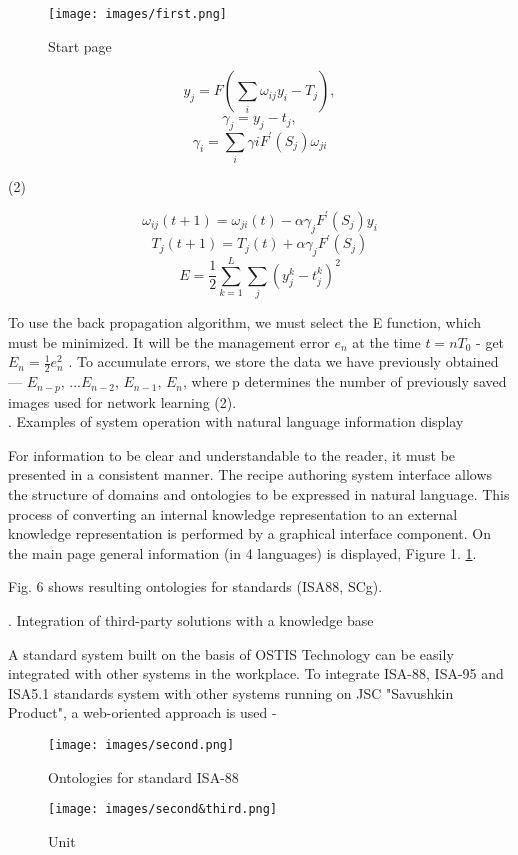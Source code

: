 \documentclass[twocolumn]{scndocument}
\begin{document}
 \setcounter{page}{168}
\begin{figure}[h]
    \centering
    \texttt{[image: images/first.png]} 
    \caption{Start page} 
    \label{Figure 1}
\end{figure}
$$y_j = F(\sum_{i}\omega_{ij} y_i - T_j ),$$
$$\gamma_{j} = y_{j} - t_{j} ,$$
$$\gamma_{i} = \sum_{i}\gamma{i}F^{'}(S_{j})\omega_{ji}$$ \begin{flushright} (2)\end{flushright}
$$\omega_{ij}(t + 1) = \omega_{ji}(t) - \alpha\gamma_{j}F^{'}(S_{j})y_i$$
$$T_{j}(t+1) = T_j(t) + \alpha\gamma_j F^{'} (S_j)$$
$$E = \frac{1}{2}\sum_{k=1}^{L} \sum_j (y_{j}^{k} - t_{j}^{k})^{2} $$

\par
To use the back propagation algorithm, we must select 
the E function, which must be minimized. It will be the
management error $e_{n}$ at the time $t = nT_{0}$ - get $E_{n} = \frac{1}{2}e^{2}_{n}$
. To accumulate errors, we store the data we have
previously obtained — $E_{n-p}$, ...$E_{n-2}$, $E_{n-1}$, $E_{n}$, where
p determines the number of previously saved images used
for network learning (2).
\vspace{2 mm} 
\\ \MakeUppercase{}. Examples of system operation with natural language
information display 
\vspace{2 mm}
\par
For information to be clear and understandable to the
reader, it must be presented in a consistent manner. The
recipe authoring system interface allows the structure of
domains and ontologies to be expressed in natural language. This process of converting an internal knowledge
representation to an external knowledge representation
is performed by a graphical interface component. On
the main page general information (in 4 languages) is
displayed, Figure 1. \ref{Figure 1}. \par
Fig. 6 shows resulting ontologies for standards (ISA88, SCg).
\vspace{2 mm}
\begin{center}
 \MakeUppercase{}. Integration of third-party solutions with a knowledge base
 \end{center}
\par A standard system built on the basis of OSTIS Technology can be easily integrated with other systems in
the workplace. To integrate ISA-88, ISA-95 and ISA5.1 standards system with other systems running on JSC
"Savushkin Product", a web-oriented approach is used -
\newpage
\begin{figure}[h]
    \centering
    \texttt{[image: images/second.png]}
    \label{Figure 7} 
    \caption{Ontologies for standard ISA-88}
\end{figure}
\begin{figure}[h]
    \centering
    \texttt{[image: images/second\&third.png]}
    \caption{Unit}
    \label{Figure 8}
\end{figure}
\end{document}
